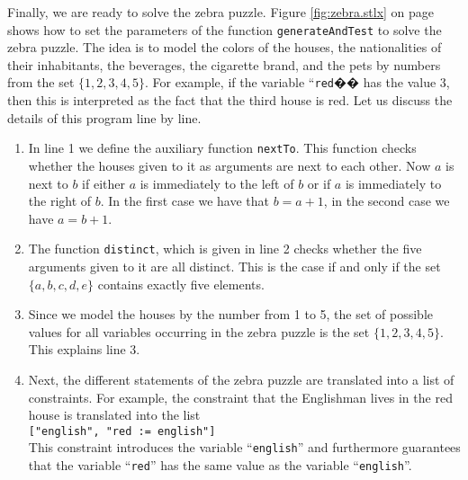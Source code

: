 Finally, we are ready to solve the zebra puzzle.  Figure \ref{fig:zebra.stlx} on page
\pageref{fig:zebra.stlx} shows how to set the parameters of the function \texttt{generateAndTest}
to solve the zebra puzzle.  The idea is to model the colors of the houses, the nationalities of
their inhabitants, the beverages, the cigarette brand, and the pets by numbers from the set
$\{1,2,3,4,5\}$.  For example, if the variable ``\texttt{red}�� has the value 3, then this is
interpreted as the fact that the third house is red.  Let us discuss the details of this program line by line.
\begin{enumerate}
\item In line 1 we define the auxiliary function \texttt{nextTo}.  This function checks whether
      the houses given to it as arguments are next to each other.  Now $a$ is next to $b$ if either
      $a$ is immediately to the left of $b$ or if $a$ is immediately to the right of $b$.  In the
      first case we have that $b = a + 1$, in the second case we have $a = b + 1$.
\item The function \texttt{distinct}, which is given in line 2 checks whether the five
      arguments given to it are all distinct.  This is the case if and only if the set
      $\{a,b,c,d,e\}$ contains exactly five elements.
\item Since we model the houses by the number from 1 to 5, the set of possible values for all
      variables occurring in the zebra puzzle is the set $\{1,2,3,4,5\}$.  This explains line 3.
\item Next, the different statements of the zebra puzzle are translated into a list of constraints.
      For example, the constraint that the Englishman lives in the red house is translated into the list
      \\[0.2cm]
      \hspace*{1.3cm}
      \texttt{["english", "red := english"]}
      \\[0.2cm]
      This constraint introduces the variable ``\texttt{english}'' and furthermore guarantees that the
      variable ``\texttt{red}'' has the same value as the variable ``\texttt{english}''. 


\end{enumerate}
